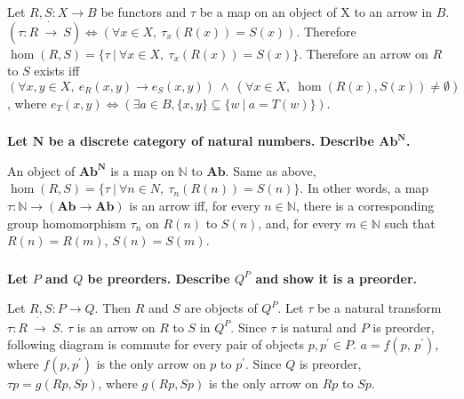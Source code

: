 \documentclass{article}
\begin{document}
Let $R, S : X \rightarrow B$ be functors and $\tau$ be a map on an object of X to an arrow in $B$. $(\tau : R\ \dot{\rightarrow}\ S) \Leftrightarrow (\forall x \in X,\ \tau_x(R(x)) = S(x))$. Therefore $\hom(R, S) = \{\tau\ |\ \forall x \in X,\ \tau_x(R(x)) = S(x)\}$. Therefore an arrow on $R$ to $S$ exists iff $(\forall x, y \in X,\ e_R(x, y) \rightarrow e_S(x, y))\ \wedge\ (\forall x \in X,\ \hom(R(x), S(x)) \neq \emptyset)$, where $e_T(x, y) \Leftrightarrow (\exists a \in B, \{x, y\} \subseteq \{ w\ |\ a = T(w) \})$.

\subsubsection{}

\textbf{Let $\mathbf{N}$ be a discrete category of natural numbers. Describe $\mathbf{Ab}^{\mathbf{N}}$.}

An object of $\mathbf{Ab}^{\mathbf{N}}$ is a map on $\mathbb{N}$ to $\mathbf{Ab}$. Same as above, $\hom(R, S) = \{\tau\ |\ \forall n \in N,\ \tau_n(R(n)) = S(n)\}$. In other words, a map $\tau : \mathbb{N} \rightarrow (\mathbf{Ab} \rightarrow \mathbf{Ab})$ is an arrow iff, for every $n \in \mathbb{N}$, there is a corresponding group homomorphism $\tau_n$ on $R(n)$ to $S(n)$, and, for every $m \in \mathbb{N}$ such that $R(n) = R(m)$, $S(n) = S(m)$. 

\subsubsection{}

\textbf{Let $P$ and $Q$ be preorders. Describe $Q^P$ and show it is a preorder.}

Let $R, S : P \rightarrow Q$. Then $R$ and $S$ are objects of $Q^P$. Let $\tau$ be a natural transform $\tau : R\ \dot{\rightarrow}\ S$. $\tau$ is an arrow on $R$ to $S$ in $Q^P$. Since $\tau$ is natural and $P$ is preorder, following diagram is commute for every pair of objects $p, p^\prime \in P$. $a = f(p,\,p^\prime)$, where $f(p, p^\prime)$ is the only arrow on $p$ to $p^\prime$. Since $Q$ is preorder, $\tau p = g(Rp, Sp)$, where $g(Rp, Sp)$ is the only arrow on $Rp$ to $Sp$.

\begin{center}
\end{center}
\end{document}

